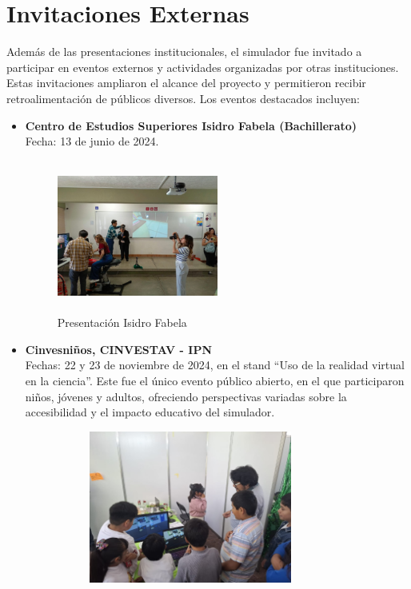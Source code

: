 \section{Invitaciones Externas}
Además de las presentaciones institucionales, el simulador fue invitado a participar en eventos externos y actividades organizadas por otras instituciones. Estas invitaciones ampliaron el alcance del proyecto y permitieron recibir retroalimentación de públicos diversos. Los eventos destacados incluyen:
\begin{itemize}
    \item \textbf{Centro de Estudios Superiores Isidro Fabela (Bachillerato)}\\
    Fecha: 13 de junio de 2024.
    \begin{figure}[thbp]
        \centering
        \includegraphics[width=0.5\textwidth, height = 5cm]{img/chapter06/CESIF_01.jpg}
        \caption{Presentación Isidro Fabela}
        \label{fig:CESIF}
    \end{figure}
    \newpage
    \item \textbf{Cinvesniños, CINVESTAV - IPN}\\
    Fechas: 22 y 23 de noviembre de 2024, en el stand  ``Uso de la realidad virtual en la ciencia''. Este fue el único evento público abierto, en el que participaron niños, jóvenes y adultos, ofreciendo perspectivas variadas sobre la accesibilidad y el impacto educativo del simulador.
    \begin{figure}[thbp]
        \centering
        \begin{subfigure}{0.45\linewidth}
            \includegraphics[width=\linewidth, height = 5cm]{img/chapter06/CINVESTAV_02.jpg}

\end{subfigure}
\end{figure}
\end{itemize}
